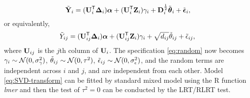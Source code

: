 %
$$
\tilde{\V{y}}_{i} = (\M{U}_{i}\Tra \M{\Delta}_i) \V{\alpha} + ( \M{U}_{i}\Tra \V{Z}_{i})\gamma_i +\V{D}^{\frac{1}{2}}_i \tilde{\M{\theta}}_i + \tilde{\M{\epsilon}}_{i},
$$
or equivalently,
\begin{equation}
\label{eq:SVD-transform}
\tilde{Y}_{ij} = (\M{U}_{ij}\Tra \M{\Delta}_i) \V{\alpha} + ( \M{U}_{ij}\Tra \V{Z}_{i})\gamma_i + \sqrt{d_{ij}} \tilde{\theta}_{ij} + \tilde{\epsilon}_{ij}, \\
\end{equation}
where $\M{U}_{ij}$ is the $j$th column of $\M{U}_i$. The specification \eqref{eq:random} now becomes
  $\gamma_i \sim \mathcal{N}(0,\sigma^2_\gamma)$, 
$\tilde{\theta}_{ij} \sim \mathcal{N}(0,\tau^2)$,
$\tilde{\epsilon}_{ij}\sim \mathcal{N}(0,\sigma_\epsilon^2)$,
and the random terms are independent across $i$ and $j$, and 
are independent from each other.
Model \eqref{eq:SVD-transform} can be fitted by standard mixed model 
using the R function {\it lmer} and then the test of $\tau^2 = 0$ can be conducted
by the LRT/RLRT test.




